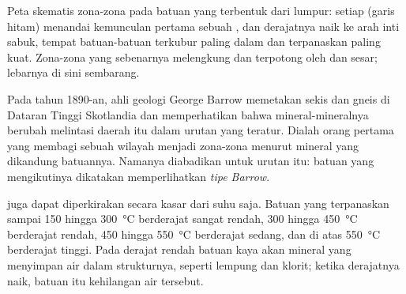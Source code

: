 \begin{omfigure}

{\small Peta skematis zona-zona  pada batuan yang terbentuk dari
lumpur: setiap  (garis hitam) menandai kemunculan pertama sebuah , dan derajatnya naik ke arah inti sabuk, tempat batuan-batuan terkubur
paling dalam dan terpanaskan paling kuat. Zona-zona yang sebenarnya melengkung
dan terpotong oleh  dan sesar; lebarnya di sini sembarang.}
\end{omfigure}

\begin{history}
Pada tahun 1890-an, ahli geologi George Barrow memetakan sekis dan gneis di
Dataran Tinggi Skotlandia dan memperhatikan bahwa mineral-mineralnya berubah
melintasi daerah itu dalam urutan yang teratur. Dialah orang pertama yang
membagi sebuah wilayah menjadi zona-zona menurut mineral yang dikandung
batuannya. Namanya diabadikan untuk urutan itu: batuan yang mengikutinya
dikatakan memperlihatkan  \emph{tipe Barrow}.
\end{history}

 juga dapat diperkirakan secara kasar dari suhu saja.
Batuan yang terpanaskan sampai 150 hingga \qty{300}{\celsius} berderajat sangat
rendah, 300 hingga \qty{450}{\celsius} berderajat rendah, 450 hingga
\qty{550}{\celsius} berderajat sedang, dan di atas \qty{550}{\celsius}
berderajat tinggi. Pada derajat rendah batuan kaya akan mineral yang menyimpan
air dalam strukturnya, seperti lempung dan klorit; ketika derajatnya naik,
batuan itu kehilangan air tersebut.


